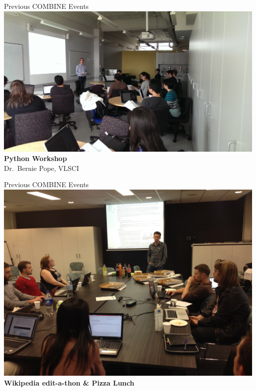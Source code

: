 \documentclass[svgnames]{beamer}
\begin{document}
\begin{frame}{Previous COMBINE Events}
    \centering
    \vfill
    \includegraphics[height=0.5\paperheight]{./images/python-workshop-photo.jpg}\\
    \textbf{Python Workshop}\\
    Dr.~Bernie Pope, VLSCI\\[2ex]
\end{frame}

\begin{frame}{Previous COMBINE Events}
    \centering
    \vfill
    \includegraphics[height=0.6\paperheight]{./images/wikipedia-editathon-photo.jpg}\\
    \textbf{Wikipedia edit-a-thon \& Pizza Lunch}\\
\end{frame}
\end{document}
